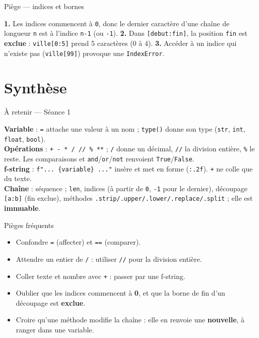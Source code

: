 \documentclass[aspectratio=169,11pt]{beamer}
\begin{document}
\begin{frame}{Piège — indices et bornes}
\begin{ucadpiege}
{\small \textbf{1.} Les indices commencent à \texttt{0}, donc le dernier caractère d'une chaîne de longueur \texttt{n} est à l'indice \texttt{n-1} (ou \texttt{-1}). \quad \textbf{2.} Dans \texttt{[debut:fin]}, la position \texttt{fin} est \textbf{exclue} : \texttt{ville[0:5]} prend 5 caractères (0 à 4). \quad \textbf{3.} Accéder à un indice qui n'existe pas (\texttt{ville[99]}) provoque une \texttt{IndexError}.}
\end{ucadpiege}
\end{frame}

\section{Synthèse}

\begin{frame}{À retenir — Séance 1}
\begin{ucadret}[L'essentiel]
{\small
\textbf{Variable} : \texttt{=} attache une valeur à un nom ; \texttt{type()} donne son type (\texttt{str}, \texttt{int}, \texttt{float}, \texttt{bool}).\\[2pt]
\textbf{Opérations} : \texttt{+ - * /\,/\!/ \% **} ; \texttt{/} donne un décimal, \texttt{//} la division entière, \texttt{\%} le reste. Les comparaisons et \texttt{and}/\texttt{or}/\texttt{not} renvoient \texttt{True}/\texttt{False}.\\[2pt]
\textbf{f-string} : \texttt{f"... \{variable\} ..."} insère et met en forme (\texttt{:.2f}). \texttt{+} ne colle que du texte.\\[2pt]
\textbf{Chaîne} : séquence ; \texttt{len}, indices (à partir de \texttt{0}, \texttt{-1} pour le dernier), découpage \texttt{[a:b]} (fin exclue), méthodes \texttt{.strip/.upper/.lower/.replace/.split} ; elle est \textbf{immuable}.}
\end{ucadret}
\end{frame}

\begin{frame}{Pièges fréquents}
\begin{itemize}\small
  \item Confondre \texttt{=} (affecter) et \texttt{==} (comparer).
  \item Attendre un entier de \texttt{/} : utiliser \texttt{//} pour la division entière.
  \item Coller texte et nombre avec \texttt{+} : passer par une f-string.
  \item Oublier que les indices commencent à \textbf{0}, et que la borne de fin d'un découpage est \textbf{exclue}.
  \item Croire qu'une méthode modifie la chaîne : elle en renvoie une \textbf{nouvelle}, à ranger dans une variable.
\end{itemize}
\end{frame}
\end{document}
